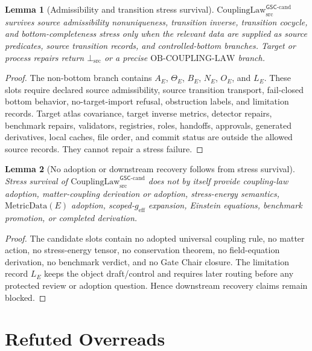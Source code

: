\documentclass[11pt]{article}
\newcommand{\geff}{g_{\mathrm{eff}}}
\newcommand{\CouplingLaw}{\mathrm{CouplingLaw}^{\mathsf{GSC}\mbox{-}\mathrm{cand}}_{\mathrm{src}}}
\newcommand{\MetricData}{\mathrm{MetricData}}
\newcommand{\BottomSrc}{\bot_{\mathrm{src}}}
\newcommand{\OBCouplingLaw}{\mathrm{OB}\mbox{-}\mathrm{COUPLING}\mbox{-}\mathrm{LAW}}
\newtheorem{lemma}{Lemma}
\begin{document}
\begin{lemma}[Admissibility and transition stress survival]
\(\CouplingLaw\) survives source admissibility nonuniqueness, transition
inverse, transition cocycle, and bottom-completeness stress only when the
relevant data are supplied as source predicates, source transition records,
and controlled-bottom branches. Target or process repairs return
\(\BottomSrc\) or a precise \(\OBCouplingLaw\) branch.
\end{lemma}

\begin{proof}
The non-bottom branch contains \(A_E\), \(\Theta_E\), \(B_E\), \(N_E\),
\(O_E\), and \(L_E\). These slots require declared source admissibility,
source transition transport, fail-closed bottom behavior, no-target-import
refusal, obstruction labels, and limitation records. Target atlas covariance,
target inverse metrics, detector repairs, benchmark repairs, validators,
registries, roles, handoffs, approvals, generated derivatives, local caches,
file order, and commit status are outside the allowed source records. They
cannot repair a stress failure.
\end{proof}

\begin{lemma}[No adoption or downstream recovery follows from stress survival]
Stress survival of \(\CouplingLaw\) does not by itself provide coupling-law
adoption, matter-coupling derivation or adoption, stress-energy semantics,
\(\MetricData(E)\) adoption, scoped-\(\geff\) expansion, Einstein equations,
benchmark promotion, or completed derivation.
\end{lemma}

\begin{proof}
The candidate slots contain no adopted universal coupling rule, no matter
action, no stress-energy tensor, no conservation theorem, no field-equation
derivation, no benchmark verdict, and no Gate Chair closure. The limitation
record \(L_E\) keeps the object draft/control and requires later routing
before any protected review or adoption question. Hence downstream recovery
claims remain blocked.
\end{proof}

\section{Refuted Overreads}
\end{document}
